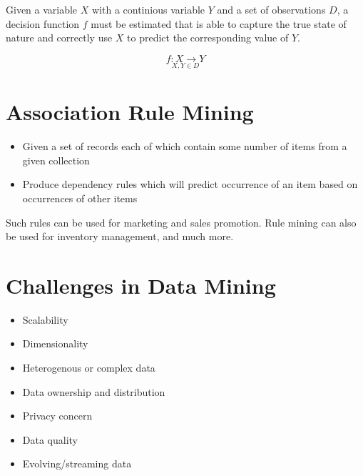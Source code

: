 Given a variable $X$ with a continious variable $Y$ 
and a set of observations $D$, a decision function $f$ must be estimated 
that is able to capture the true state of nature and correctly use $X$ to 
predict the corresponding value of $Y$.  

\begin{equation*}
    \underset{X,Y \in D}{f: X \rightarrow Y}
\end{equation*}

\section{Association Rule Mining}
\begin{itemize}
    \item Given a set of records each of which contain some number of items from a given collection
    \item Produce dependency rules which will predict occurrence of an item based on occurrences of other items
\end{itemize}
Such rules can be used for marketing and sales promotion. Rule mining can also be used for inventory management, and much more.

\section{Challenges in Data Mining}
\begin{itemize}
    \item Scalability
    \item Dimensionality
    \item Heterogenous or complex data
    \item Data ownership and distribution
    \item Privacy concern
    \item Data quality
    \item Evolving/streaming data
\end{itemize}

